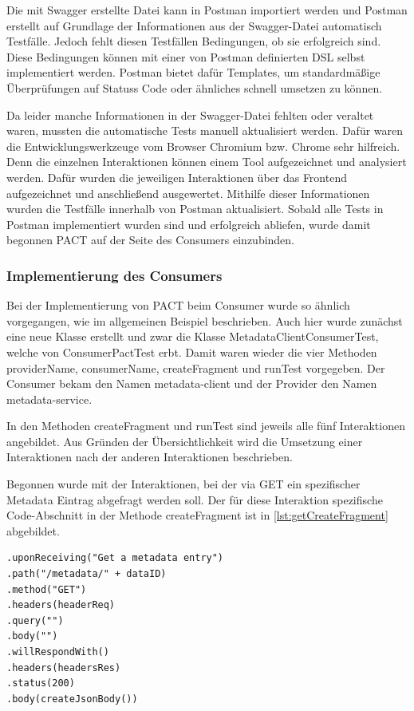 \documentclass{llncs}
\begin{document}
Die mit Swagger erstellte Datei kann in Postman importiert werden und Postman erstellt auf Grundlage der Informationen aus der Swagger-Datei automatisch Testfälle. Jedoch fehlt diesen Testfällen Bedingungen, ob sie erfolgreich sind. Diese Bedingungen können mit einer von Postman definierten DSL selbst implementiert werden. Postman bietet dafür Templates, um standardmäßige Überprüfungen auf Statuss Code oder ähnliches schnell umsetzen zu können.

Da leider manche Informationen in der Swagger-Datei fehlten oder veraltet waren, mussten die automatische Tests manuell aktualisiert werden. Dafür waren die Entwicklungswerkzeuge vom Browser Chromium bzw. Chrome sehr hilfreich. Denn die einzelnen Interaktionen können einem Tool aufgezeichnet und analysiert werden. Dafür wurden die jeweiligen Interaktionen über das Frontend aufgezeichnet und anschließend ausgewertet. Mithilfe dieser Informationen wurden die Testfälle innerhalb von Postman aktualisiert. Sobald alle Tests in Postman implementiert wurden sind und erfolgreich abliefen, wurde damit begonnen PACT auf der Seite des Consumers einzubinden.

\subsubsection{Implementierung des Consumers}
Bei der Implementierung von PACT beim Consumer wurde so ähnlich vorgegangen, wie im allgemeinen Beispiel beschrieben. Auch hier wurde zunächst eine neue Klasse erstellt und zwar die Klasse MetadataClientConsumerTest, welche von ConsumerPactTest erbt. Damit waren wieder die vier Methoden providerName, consumerName, createFragment und runTest vorgegeben. Der Consumer bekam den Namen metadata-client und der Provider den Namen metadata-service. 

In den Methoden createFragment und runTest sind jeweils alle fünf Interaktionen angebildet. Aus Gründen der Übersichtlichkeit wird die Umsetzung einer Interaktionen nach der anderen Interaktionen beschrieben.

Begonnen wurde mit der Interaktionen, bei der via GET ein spezifischer Metadata Eintrag abgefragt werden soll.
Der für diese Interaktion spezifische Code-Abschnitt in der Methode createFragment ist in \ref{lst:getCreateFragment} abgebildet.

\lstset{language = Java}
\begin{lstlisting}[caption=Test,label=lst:getCreateFragment]
.uponReceiving("Get a metadata entry")
.path("/metadata/" + dataID)
.method("GET")
.headers(headerReq)
.query("")
.body("")
.willRespondWith()
.headers(headersRes)
.status(200)
.body(createJsonBody())
\end{lstlisting}
\end{document}
